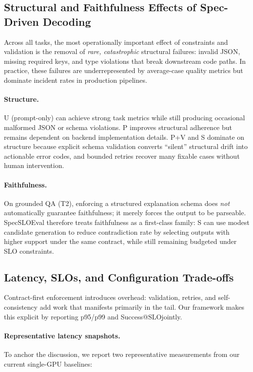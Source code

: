 \documentclass[11pt]{article}
\newcommand{\slo}{\ensuremath{\mathrm{SLO}}}
\begin{document}
\subsection{Structural and Faithfulness Effects of Spec-Driven Decoding}
\label{sec:results-structure-faith}

Across all tasks, the most operationally important effect of constraints and validation is the removal of \emph{rare, catastrophic} structural failures:
invalid JSON, missing required keys, and type violations that break downstream code paths.
In practice, these failures are underrepresented by average-case quality metrics but dominate incident rates in production pipelines.

\paragraph{Structure.}
U (prompt-only) can achieve strong task metrics while still producing occasional malformed JSON or schema violations.
P improves structural adherence but remains dependent on backend implementation details.
P+V and S dominate on structure because explicit schema validation converts “silent” structural drift into actionable error codes, and bounded retries recover many fixable cases without human intervention.

\paragraph{Faithfulness.}
On grounded QA (T2), enforcing a structured explanation schema does \emph{not} automatically guarantee faithfulness; it merely forces the output to be parseable.
SpecSLOEval therefore treats faithfulness as a first-class family: S can use modest candidate generation to reduce contradiction rate by selecting outputs with higher support under the same contract, while still remaining budgeted under SLO constraints.

\subsection{Latency, SLOs, and Configuration Trade-offs}
\label{sec:results-slo}

Contract-first enforcement introduces overhead: validation, retries, and self-consistency add work that manifests primarily in the tail.
Our framework makes this explicit by reporting p95/p99 and Success@\slo jointly.

\paragraph{Representative latency snapshots.}
To anchor the discussion, we report two representative measurements from our current single-GPU baselines:
\end{document}
